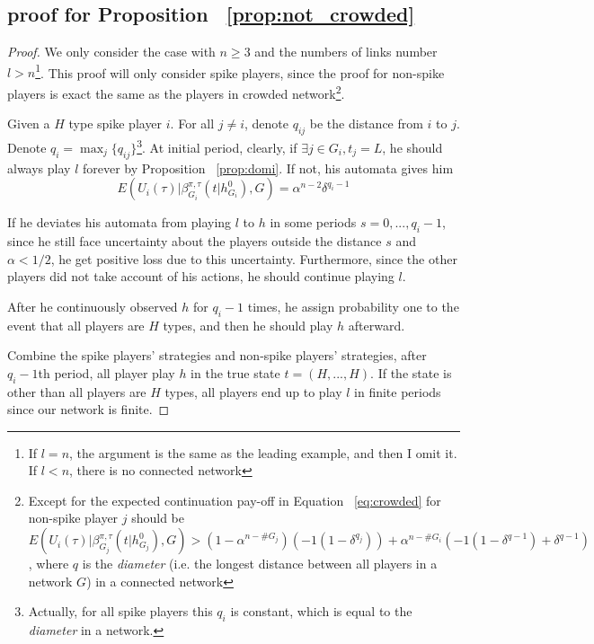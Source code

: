 \documentclass[12pt,letter]{article}
\theoremstyle{remark}
\theoremstyle{remark}
\theoremstyle{claim}
\begin{document}
\subsection{proof for Proposition ~\ref{prop:not_crowded}}
\begin{proof}

We only consider the case with $n\geq 3$ and the numbers of links number $l> n$\footnote{If $l=n$, the argument is the same as the leading example, and then I omit it. If $l<n$, there is no connected network}. This proof will only consider spike players, since the proof for non-spike players is exact the same as the players in crowded network\footnote{Except for the expected continuation pay-off in Equation ~\ref{eq:crowded} for non-spike player $j$ should be $E(U_i(\tau)|\beta^{\pi,\tau}_{G_j}(t|h^0_{G_j}), G)>(1-\alpha^{n-\# G_j})(-1(1-\delta^{q_j}))+\alpha^{n-\# G_i}(-1(1-\delta^{q-1})+\delta^{q-1})$, where $q$ is the \textit{diameter} (i.e. the longest distance between all players in a network $G$) in a connected network}. 

Given a $H$ type spike player $i$. For all $j\neq i$, denote $q_{ij}$ be the distance from $i$ to $j$. Denote $q_i=\max_{j}\{q_{ij}\}$\footnote{Actually, for all spike players this $q_i$ is constant, which is equal to the \textit{diameter} in a network.}. At initial period, clearly, if $\exists j\in G_i, t_j=L$, he should always play $l$ forever by Proposition ~\ref{prop:domi}. If not, his automata gives him 
\[
E(U_i(\tau)|\beta^{\pi,\tau}_{G_i}(t|h^0_{G_i}), G) = \alpha^{n-2}\delta^{q_{i}-1}
\]

If he deviates his automata from playing $l$ to $h$ in some periods $s=0,...,q_{i}-1$, since he still face uncertainty about the players outside the distance $s$ and $\alpha<1/2$, he get positive loss due to this uncertainty. Furthermore, since the other players did not take account of his actions, he should continue playing $l$.

After he continuously observed $h$ for $q_{i}-1$ times, he assign probability one to the event that all players are $H$ types, and then he should play $h$ afterward.

Combine the spike players' strategies and non-spike players' strategies, after $q_{i}-1$th period, all player play $h$ in the true state $t=(H,...,H)$. If the state is other than all players are $H$ types, all players end up to play $l$ in finite periods since our network is finite.

\end{proof}
\end{document}
